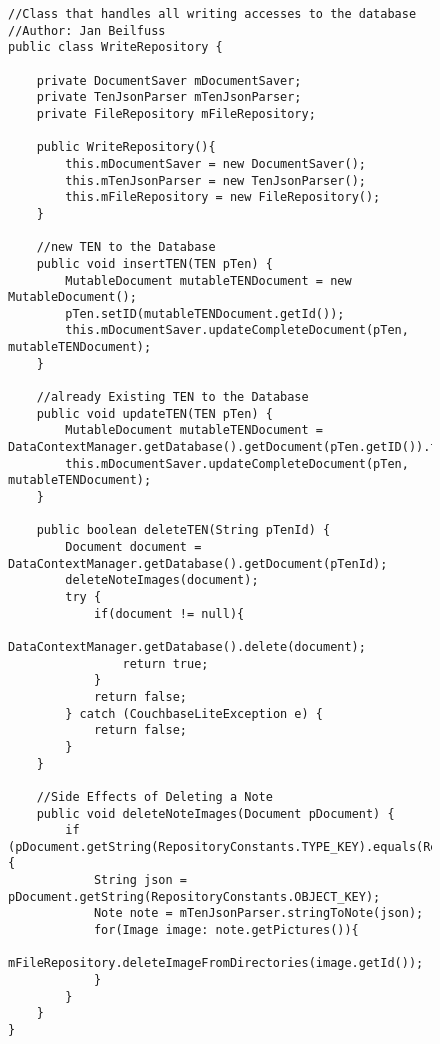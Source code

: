 \begin{figure}[H]
\begin{lstlisting}[caption=WriteRepository (Jan Beilfuß)]
//Class that handles all writing accesses to the database
//Author: Jan Beilfuss
public class WriteRepository {

    private DocumentSaver mDocumentSaver;
    private TenJsonParser mTenJsonParser;
    private FileRepository mFileRepository;

    public WriteRepository(){
        this.mDocumentSaver = new DocumentSaver();
        this.mTenJsonParser = new TenJsonParser();
        this.mFileRepository = new FileRepository();
    }

    //new TEN to the Database
    public void insertTEN(TEN pTen) {
        MutableDocument mutableTENDocument = new MutableDocument();
        pTen.setID(mutableTENDocument.getId());
        this.mDocumentSaver.updateCompleteDocument(pTen, mutableTENDocument);
    }

    //already Existing TEN to the Database
    public void updateTEN(TEN pTen) {
        MutableDocument mutableTENDocument = DataContextManager.getDatabase().getDocument(pTen.getID()).toMutable();
        this.mDocumentSaver.updateCompleteDocument(pTen, mutableTENDocument);
    }

    public boolean deleteTEN(String pTenId) {
        Document document = DataContextManager.getDatabase().getDocument(pTenId);
        deleteNoteImages(document);
        try {
            if(document != null){
                DataContextManager.getDatabase().delete(document);
                return true;
            }
            return false;
        } catch (CouchbaseLiteException e) {
            return false;
        }
    }

    //Side Effects of Deleting a Note
    public void deleteNoteImages(Document pDocument) {
        if (pDocument.getString(RepositoryConstants.TYPE_KEY).equals(RepositoryConstants.NOTE_TYPE)) {
            String json = pDocument.getString(RepositoryConstants.OBJECT_KEY);
            Note note = mTenJsonParser.stringToNote(json);
            for(Image image: note.getPictures()){
                mFileRepository.deleteImageFromDirectories(image.getId());
            }
        }
    }
}
\end{lstlisting}
\end{figure}
